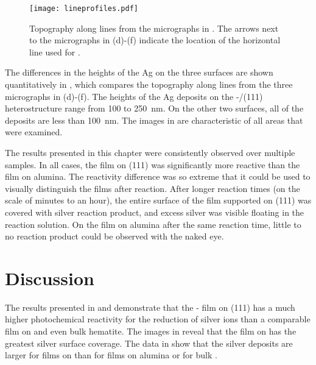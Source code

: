 \begin{figure}
\begin{center}
\texttt{[image: lineprofiles.pdf]}
\caption[Line profiles from ]{%
	Topography along lines from the  micrographs in . 
	The arrows next to the micrographs in (d)-(f) 
	indicate the location of the horizontal line used for .}
\label{fig:lineprofiles}
\end{center}
\end{figure}
The differences in the heights of the Ag on the three surfaces are shown quantitatively in , which compares the topography along lines from the three micrographs in (d)-(f). The heights of the Ag deposits on the \textalpha-/(111) heterostructure range from 100 to \SI{250}{\nano\meter}.  On the other two surfaces, all of the deposits are less than \SI{100}{\nano\meter}.  The images in  are characteristic of all areas that were examined.

The results presented in this chapter were consistently observed over multiple samples. In all cases, the film on (111) was significantly more reactive than the film on alumina. The reactivity difference was so extreme that it could be used to visually distinguish the films after reaction. After longer reaction times (on the scale of minutes to an hour), the entire surface of the film supported on (111) was covered with silver reaction product, and excess silver was visible floating in the reaction solution. On the film on alumina after the same reaction time, little to no reaction product could be observed with the naked eye.


\section{Discussion}
\label{sec:single.crystal.discussion}


The results presented in  and  demonstrate that the \textalpha- film on (111) has a much higher photochemical reactivity for the reduction of silver ions than a comparable film on  and even bulk hematite.  The images in  reveal that the film on  has the greatest silver surface coverage. The data in  show that the silver deposits are larger for films on  than for films on alumina or for bulk . 

